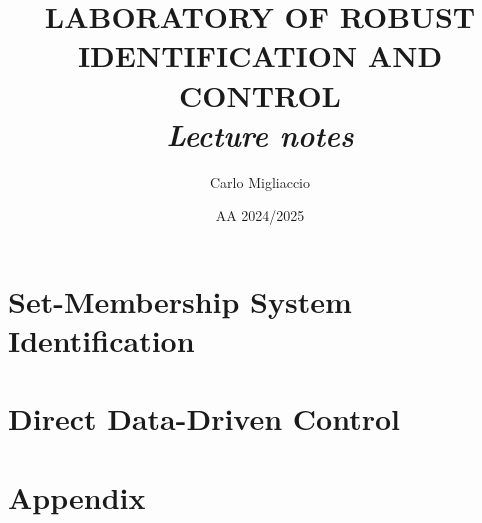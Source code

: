 \documentclass[a4paper, 12pt]{report}
\title{
    {\color{black}
    \textbf{  \Huge{  LABORATORY OF
    ROBUST IDENTIFICATION AND CONTROL } }\\}
    \textit{Lecture notes}
    \linespread{2}
}
\author{Carlo Migliaccio}
\date{AA 2024/2025}
\theoremstyle{definition}
\theoremstyle{remark}
\begin{document}
\maketitle
\tableofcontents


\part{Set-Membership System Identification}









\part{Direct Data-Driven Control}



\part{Appendix}\label{p:Appendix}



\begin{comment}



\end{comment}

\newpage
\printbibliography
\end{document}
